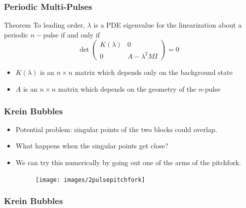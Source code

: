 \documentclass[16pt]{beamer}
\begin{document}
\begin{frame}
\frametitle{Periodic Multi-Pulses} 
	\fontsize{16}{7.2}\selectfont
    \begin{block}{Theorem}
    To leading order, $\lambda$ is a PDE eigenvalue for the linearization about a periodic $n-$pulse if and only if 
    \[
    \det\begin{pmatrix}K(\lambda) & 0 \\ 0 & A - \lambda^2  M I \end{pmatrix} = 0
    \]
    \begin{itemize}
    	\item $K(\lambda)$ is an $n \times n$ matrix which depends only on the background state
    	\item $A$ is an $n \times n$ matrix which depends on the geometry of the $n$-pulse
    \end{itemize}
    \end{block}
\end{frame}

\begin{frame}
	\frametitle{Krein Bubbles}
	\fontsize{16}{7.2}\selectfont
	\begin{itemize}
		\item Potential problem: singular points of the two blocks could overlap.
		\vspace{0.5cm}
		\item What happens when the singular points get close?
		\vspace{0.5cm}
		\item We can try this numerically by going out one of the arms of the pitchfork.

		\begin{figure}
		\begin{center}
		\texttt{[image: images/2pulsepitchfork]}
		\end{center}
		\end{figure}
	\end{itemize}
\end{frame}

\begin{frame}
	\frametitle{Krein Bubbles}
	\fontsize{16}{7.2}\selectfont
	\begin{center}
	\end{center}
\end{frame}
\end{document}
